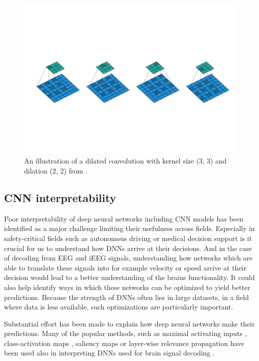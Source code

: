 \begin{figure}[!htpb]
\centering
   \includegraphics[width=0.8\linewidth]{img/ch3/dilated-conv.pdf}
   \caption[Dilated convolution]{An illustration of a dilated convolution with kernel size (3, 3) and dilation (2, 2) from \cite{dilated-conv}.}
   \label{fig:dilation}
\end{figure}


\subsection{CNN interpretability}
Poor interpretability of deep neural networks including CNN models has been identified as a major challenge limiting their usefulness across fields. 
Especially in safety-critical fields such as autonomous driving or medical decision support is it crucial for us to understand how DNNs arrive at their decisions.
And in the case of decoding from EEG and iEEG signals, understanding how networks which are able to translate these signals into for example velocity or speed arrive at their decision would lead to a better understanding of the brains functionality. 
It could also help identify ways in which these networks can be optimized to yield better predictions.
Because the strength of DNNs often lies in large datasets, in a field where data is less available, such optimizations are particularly important.

Substantial effort has been made to explain how deep neural networks make their predictions.
Many of the popular methods, such as maximal activating inputs \cite{maximizing-activation}, class-activation maps \cite{class-activation-maps}, saliency maps \cite{gradient-visualization} or layer-wise relevance propagation \cite{sturm-interpretable-2016} have been used also in interpreting DNNs used for brain signal decoding \cite{goodfellow-towards-2018, hartmann-hierarchical-2018, rieke-visualizing-2018, yang-visual-2018,  sturm-interpretable-2016, }.

